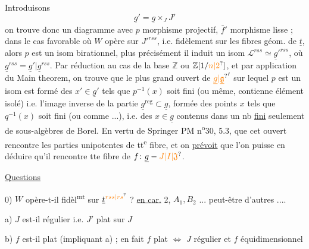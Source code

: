 Introduisons
\[
\underline g'=\underline g\times_J J'
\]
on trouve donc un diagramme
avec $p$ morphisme projectif, $\bar f'$ morphisme lisse ; dans le cas favorable où $W$ opère  sur $J'^{rss}$, i.e. fidèlement sur les fibres géom. de $\underline t$, alors $p$  est un isom birationnel, plus précisément il induit un isom $\mathscr L^{rss}\simeq\underline g'^{rss}$, où $\underline g^{rss}=\underline g'|\underline g^{rss}$.
Par réduction au cas de la base $\mathbb Z$ ou $\mathbb Z[1/\unsure{n|2}]$, et par application du Main theorem, on trouve que le plus grand ouvert de ${\unsure{\underline g|\underline{\mathfrak g}}}'$ sur lequel $p$ est un isom est formé des $x'\in\underline g'$ tels que $p^{-1}(x)$ soit fini (ou même, contienne  élément isolé) i.e. l'image inverse de la partie  $\underline g^{\mathrm{reg}}\subset\underline g$, formée des points $x$ tels que $q^{-1}(x)$ soit fini (ou comme ...), i.e. des $x\in\underline g$ contenus dans un nb \uline{fini} seulement de sous-algèbres de Borel. En vertu de Springer PM n\textsuperscript{o}30, 5.3,  que cet ouvert  rencontre les parties unipotentes de tt\textsuperscript{e} fibre, et on \uline{prévoit} que l'on puisse en déduire qu'il rencontre tte fibre de $f\colon\underline g-\unsure{J|I|\mathfrak J}$.

\uline{Questions}

0) $W$ opère-t-il fidèl\textsuperscript{mt} sur $\underline t^{\unsure{rss|rs}}$ ?  \uline{en car.} 2,  $A_1,B_2$ ... peut-être d'autres ....

a) $J$ est-il régulier i.e. $J'$ plat sur $J$

b) $f$ est-il plat (impliquant a) ; en fait $f$ plat $\Longleftrightarrow$ $J$ régulier et $f$ équidimensionnel

